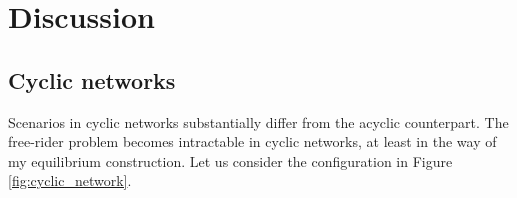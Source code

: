 \documentclass[12pt,letter]{article}
\theoremstyle{definition}
\theoremstyle{remark}
\theoremstyle{claim}
\begin{document}
\section{Discussion}
\label{sec:varies}
%
%


%
%
%
%
%
%
\subsection{Cyclic networks}
\label{sec:cyclic}


Scenarios in cyclic networks substantially differ from the acyclic counterpart. The free-rider problem becomes intractable in cyclic networks, at least in the way of my equilibrium construction. Let us consider the configuration in Figure \ref{fig:cyclic_network}.
\end{document}
